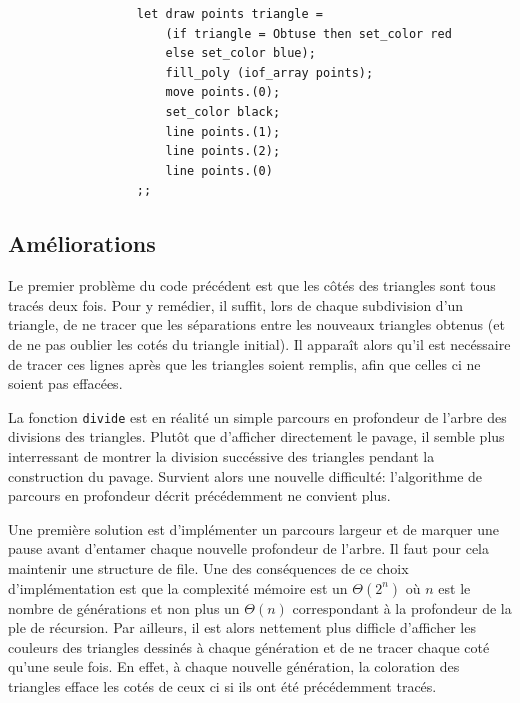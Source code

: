 \documentclass[a4paper, 11pt]{article}%
\begin{document}
                \begin{lstlisting}
                  let draw points triangle =
                      (if triangle = Obtuse then set_color red
                      else set_color blue);
                      fill_poly (iof_array points);
                      move points.(0);
                      set_color black;
                      line points.(1);  
                      line points.(2);
                      line points.(0)
                  ;;
                \end{lstlisting}
                
	\subsection{Améliorations}

		Le premier problème du code précédent est que les
                côtés des triangles sont tous tracés deux fois. Pour y
                remédier, il suffit, lors de chaque subdivision d'un
                triangle, de ne tracer que les séparations entre les
                nouveaux triangles obtenus (et de ne pas oublier les
                cotés du triangle initial). Il apparaît alors qu'il est necéssaire de tracer ces
                lignes après que les triangles soient remplis, afin
                que celles ci ne soient pas effacées.

		La fonction \texttt{divide} est en réalité un simple
                parcours en profondeur de l'arbre des divisions des
                triangles.
		Plutôt que d'afficher directement le pavage, il semble
                plus interressant de montrer la division succéssive
                des triangles pendant la construction du
                pavage. Survient alors une nouvelle difficulté:
                l'algorithme de parcours en profondeur décrit
                précédemment ne convient plus.

 
		Une première solution est d'implémenter un parcours
                largeur et de marquer une pause avant d'entamer chaque
                nouvelle profondeur de l'arbre. Il faut pour cela
                maintenir une structure de file. Une des conséquences
                de ce choix d'implémentation est que la
                complexité mémoire est un $\Theta(2^{n})$ où $n$ est le
                nombre de générations et non plus un $\Theta(n)$
                correspondant à la profondeur de la ple de récursion.
                Par ailleurs, il est
                alors nettement plus difficle d'afficher les couleurs
                des triangles dessinés à chaque génération et de ne
                tracer chaque coté qu'une seule fois. En effet, à
                chaque nouvelle génération, la coloration des
                triangles efface les cotés de ceux ci si ils ont été
                précédemment tracés. 
                
\end{document}
